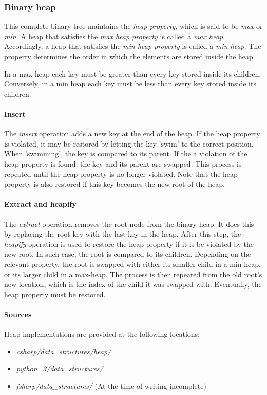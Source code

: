\documentclass{article}
\begin{document}
\subsubsection{Binary heap}
This complete binary tree maintains the {\em heap property}, which is said to be {\em max} or {\em min}.
A heap that satisfies the {\em max heap property} is called a {\em max heap}.
Accordingly, a heap that satisfies the {\em min heap property} is called a {\em min heap}.
The property determines the order in which the elements are stored inside the heap.

In a max heap each key must be greater than every key stored inside its children.
Conversely, in a min heap each key must be less than every key stored inside its children.

\paragraph{Insert}
The {\em insert} operation adds a new key at the end of the heap. If the heap property is violated,
it may be restored by letting the key 'swim' to the correct position. When 'swimming', the key
is compared to its parent. If the a violation of the heap property is found, the key and its parent
are swapped. This process is repeated until the heap property is no longer violated. Note that the
heap property is also restored if this key becomes the new root of the heap.

\paragraph{Extract and heapify}
The {\em extract} operation removes the root node from the binary heap. It does this by replacing
the root key with the last key in the heap. After this step, the {\em heapify} operation is used to
restore the heap property if it is be violated by the new root. In such case, the root is compared
to its children. Depending on the relevant property, the root is swapped with either its smaller child in a
min-heap, or its larger child in a max-heap. The process is then repeated from the old root's new location,
which is the index of the child it was swapped with. Eventually, the heap property must be restored.

\paragraph{Sources}
Heap implementations are provided at the following locations:
\begin{itemize}
\item{{\em csharp/data\_structures/heap/}}
\item{{\em python\_3/data\_structures/}}
\item{{\em fsharp/data\_structures/} (At the time of writing incomplete)}
\end{itemize}
\end{document}
